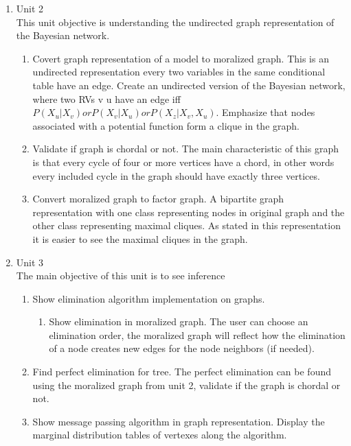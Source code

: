 \documentclass{article}
\begin{document}
\begin{enumerate}
        \vspace{0.5cm}

        \item Unit 2\\
        This unit objective is understanding the undirected graph representation of the Bayesian network.
        \begin{enumerate}
            \item 
             Covert graph representation of a model to moralized graph. This is an undirected representation every two variables in the same conditional table have an edge. Create an undirected version of the Bayesian network, where two RVs v u have an edge iff  $P(X_u | X_v) or P(X_v | X_u) or P(X_z | X_v, X_u) $. Emphasize that nodes associated with a potential function form a clique in the graph.\\
            \item Validate if graph is chordal or not. The main characteristic of this graph is that every cycle of four or more vertices have a chord, in other words every included cycle in the graph should have exactly three vertices. 
            \item Convert moralized graph to factor graph. A bipartite graph representation with one class representing nodes in original graph and the other class representing maximal cliques. As stated in this representation it is easier to see the maximal cliques in the graph.
        \end{enumerate}
        \item Unit 3\\
            The main objective of this unit is to see inference 
        \begin{enumerate}
            \item Show elimination algorithm implementation on graphs.
            \begin{enumerate}
                \item Show elimination in moralized graph. The user can choose an elimination order, the moralized graph will reflect how the elimination of a node creates new edges for the node neighbors (if needed).
            \end{enumerate}
            \item Find perfect elimination for tree. The perfect elimination can be found using the moralized graph from unit 2, validate if the graph is chordal or not.
            \item Show message passing algorithm in graph representation. Display the marginal distribution tables of vertexes along the algorithm.

\end{enumerate}
\end{enumerate}
\end{document}
